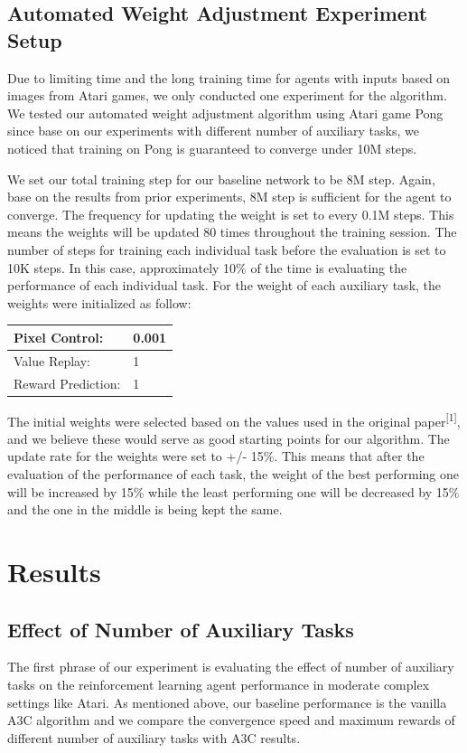 \documentclass[12pt,twocolumn,letterpaper]{article}
\begin{document}
\subsection{Automated Weight Adjustment Experiment Setup}
Due to limiting time and the long training time for agents with inputs based on images from Atari games, we only conducted one experiment for the algorithm. We tested our automated weight adjustment algorithm using Atari game Pong since base on our experiments with different number of auxiliary tasks, we noticed that training on Pong is guaranteed to converge under 10M steps.

We set our total training step for our baseline network to be 8M step. Again, base on the results from prior experiments, 8M step is sufficient for the agent to converge. The frequency for updating the weight is set to every 0.1M steps. This means the weights will be updated 80 times throughout the training session. The number of steps for training each individual task before the evaluation is set to 10K steps. In this case, approximately 10\% of the time is evaluating the performance of each individual task. For the weight of each auxiliary task, the weights were initialized as follow:

\begin{table}[H]
\centering
\begin{tabular}{|l|l|}
\hline
Pixel Control:     & 0.001 \\ \hline
Value Replay:      & 1     \\ \hline
Reward Prediction: & 1     \\ \hline
\end{tabular}
\end{table}

The initial weights were selected based on the values used in the original paper\textsuperscript{[1]}, and we believe these would serve as good starting points for our algorithm.
The update rate for the weights were set to +/- 15\%. This means that after the evaluation of the performance of each task, the weight of the best performing one will be increased by 15\% while the least performing one will be decreased by 15\% and the one in the middle is being kept the same. 


\section{Results}
\subsection{Effect of Number of Auxiliary Tasks}
The first phrase of our experiment is evaluating the effect of number of auxiliary tasks on the reinforcement learning agent performance in moderate complex settings like Atari. As mentioned above, our baseline performance is the vanilla A3C algorithm and we compare the convergence speed and maximum rewards of different number of auxiliary tasks with A3C results. 
\end{document}
